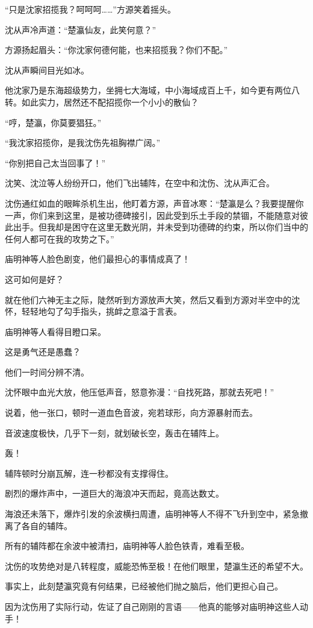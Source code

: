 \begin{this_body}
“只是沈家招揽我？呵呵呵……”方源笑着摇头。

沈从声冷声道：“楚瀛仙友，此笑何意？”

方源扬起眉头：“你沈家何德何能，也来招揽我？你们不配。”

沈从声瞬间目光如冰。

他沈家乃是东海超级势力，坐拥七大海域，中小海域成百上千，如今更有两位八转。如此实力，居然还不配招揽你一个小小的散仙？

“哼，楚瀛，你莫要猖狂。”

“我沈家招揽你，是我沈伤先祖胸襟广阔。”

“你别把自己太当回事了！”

沈笑、沈泣等人纷纷开口，他们飞出辅阵，在空中和沈伤、沈从声汇合。

沈伤通红如血的眼眸杀机生出，他盯着方源，声音冰寒：“楚瀛是么？我要提醒你一声，你们来到这里，是被功德碑接引，因此受到乐土手段的禁锢，不能随意对彼此出手。但我却是困守在这里无数光阴，并未受到功德碑的约束，所以你们当中的任何人都可在我的攻势之下。”

庙明神等人脸色剧变，他们最担心的事情成真了！

这可如何是好？

就在他们六神无主之际，陡然听到方源放声大笑，然后又看到方源对半空中的沈怀，轻轻地勾了勾手指头，挑衅之意溢于言表。

庙明神等人看得目瞪口呆。

这是勇气还是愚蠢？

他们一时间分辨不清。

沈怀眼中血光大放，他压低声音，怒意弥漫：“自找死路，那就去死吧！”

说着，他一张口，顿时一道血色音波，宛若球形，向方源暴射而去。

音波速度极快，几乎下一刻，就划破长空，轰击在辅阵上。

轰！

辅阵顿时分崩瓦解，连一秒都没有支撑得住。

剧烈的爆炸声中，一道巨大的海浪冲天而起，竟高达数丈。

海浪还未落下，爆炸引发的余波横扫周遭，庙明神等人不得不飞升到空中，紧急撤离了各自的辅阵。

所有的辅阵都在余波中被清扫，庙明神等人脸色铁青，难看至极。

沈伤的攻势绝对是八转程度，威能恐怖至极！在他们眼里，楚瀛生还的希望不大。

事实上，此刻楚瀛究竟有何结果，已经被他们抛之脑后，他们更担心自己。

因为沈伤用了实际行动，佐证了自己刚刚的言语——他真的能够对庙明神这些人动手！


\end{this_body}
